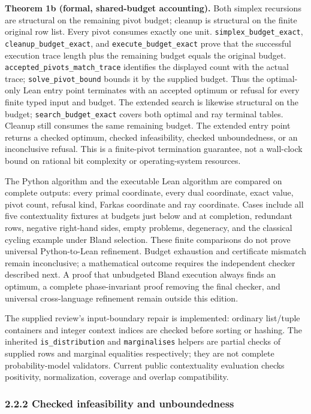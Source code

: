 \documentclass[
  10pt,
]{article}
\begin{document}
\textbf{Theorem 1b (formal, shared-budget accounting).} Both simplex recursions are structural on the remaining pivot budget; cleanup is structural on the finite original row list. Every pivot consumes exactly one unit. \texttt{simplex\_budget\_exact}, \texttt{cleanup\_budget\_exact}, and \texttt{execute\_budget\_exact} prove that the successful execution trace length plus the remaining budget equals the original budget. \texttt{accepted\_pivots\_match\_trace} identifies the displayed count with the actual trace; \texttt{solve\_pivot\_bound} bounds it by the supplied budget. Thus the optimal-only Lean entry point terminates with an accepted optimum or refusal for every finite typed input and budget. The extended search is likewise structural on the budget; \texttt{search\_budget\_exact} covers both optimal and ray terminal tables. Cleanup still consumes the same remaining budget. The extended entry point returns a checked optimum, checked infeasibility, checked unboundedness, or an inconclusive refusal. This is a finite-pivot termination guarantee, not a wall-clock bound on rational bit complexity or operating-system resources.

The Python algorithm and the executable Lean algorithm are compared on complete outputs: every primal coordinate, every dual coordinate, exact value, pivot count, refusal kind, Farkas coordinate and ray coordinate. Cases include all five contextuality fixtures at budgets just below and at completion, redundant rows, negative right-hand sides, empty problems, degeneracy, and the classical cycling example under Bland selection. These finite comparisons do not prove universal Python-to-Lean refinement. Budget exhaustion and certificate mismatch remain inconclusive; a mathematical outcome requires the independent checker described next. A proof that unbudgeted Bland execution always finds an optimum, a complete phase-invariant proof removing the final checker, and universal cross-language refinement remain outside this edition.

The supplied review's input-boundary repair is implemented: ordinary list/tuple containers and integer context indices are checked before sorting or hashing. The inherited \texttt{is\_distribution} and \texttt{marginalises} helpers are partial checks of supplied rows and marginal equalities respectively; they are not complete probability-model validators. Current public contextuality evaluation checks positivity, normalization, coverage and overlap compatibility.

\subsubsection{2.2.2 Checked infeasibility and unboundedness}\label{checked-infeasibility-and-unboundedness}
\end{document}
